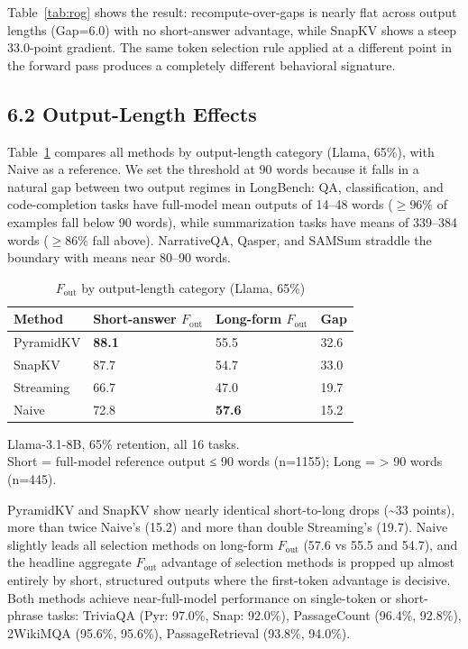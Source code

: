 \documentclass[10pt,letterpaper]{article}
\begin{document}
Table~\ref{tab:rog} shows
the result: recompute-over-gaps is nearly flat across output lengths
(Gap=6.0) with no short-answer advantage, while SnapKV shows a steep
33.0-point gradient. The same token selection rule applied at a
different point in the forward pass produces a completely different
behavioral signature.

\hypertarget{output-length-effects}{%
\subsection{6.2 Output-Length Effects}\label{output-length-effects}}

Table~\ref{tab:t5} compares all methods by output-length category (Llama, 65\%),
with Naive as a reference. We set the threshold at 90 words because it
falls in a natural gap between two output regimes in LongBench: QA,
classification, and code-completion tasks have full-model mean outputs
of 14--48 words ($\geq$96\% of examples fall below 90 words), while
summarization tasks have means of 339--384 words ($\geq$86\% fall above).
NarrativeQA, Qasper, and SAMSum straddle the boundary with means near
80--90 words.
\begin{table}[H]
\centering
\small
\caption{\(F_{\text{out}}\) by output-length category (Llama, 65\%)}
\label{tab:t5}
\begin{tabular}{@{}llll@{}}
\toprule
Method & Short-answer \(F_{\text{out}}\) & Long-form \(F_{\text{out}}\)
& Gap\\
\midrule
PyramidKV & \textbf{88.1} & 55.5 & 32.6\\
SnapKV & 87.7 & 54.7 & 33.0\\
Streaming & 66.7 & 47.0 & 19.7\\
Naive & 72.8 & \textbf{57.6} & 15.2\\
\bottomrule
\end{tabular}

\center Llama-3.1-8B, 65\% retention, all 16 tasks.
\\Short = full-model reference output ≤ 90 words (n=1155); Long =
\textgreater{} 90 words (n=445).
\end{table}

PyramidKV and SnapKV show nearly identical short-to-long drops
(\textasciitilde33 points), more than twice Naive's (15.2) and more than
double Streaming's (19.7). Naive slightly leads all selection methods on
long-form \(F_{\text{out}}\) (57.6 vs 55.5 and 54.7), and the headline
aggregate \(F_{\text{out}}\) advantage of selection methods is propped up
almost entirely by short, structured outputs where the first-token advantage
is decisive. Both methods achieve near-full-model performance on single-token
or short-phrase tasks: TriviaQA (Pyr: 97.0\%, Snap: 92.0\%), PassageCount
(96.4\%, 92.8\%), 2WikiMQA (95.6\%, 95.6\%), PassageRetrieval (93.8\%, 94.0\%).
\end{document}
